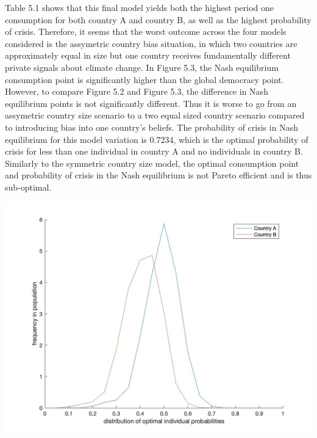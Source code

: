 \documentclass[11pt,preprint, authoryear]{elsarticle}
\let\origfigure\figure
\let\endorigfigure\endfigure
\renewenvironment{figure}[1][2] {
    \expandafter\origfigure\expandafter[H]
} {
    \endorigfigure
}
\numberwithin{equation}{section}
\numberwithin{figure}{section}
\numberwithin{table}{section}
\begin{document}
Table 5.1 shows that this final model yields both the highest period one
consumption for both country A and country B, as well as the highest
probability of crisis. Therefore, it seems that the worst outcome across
the four models considered is the assymetric country bias situation, in
which two countries are approximately equal in size but one country
receives fundamentally different private signals about climate change.
In Figure 5.3, the Nash equilibrium consumption point is significantly
higher than the global democracy point. However, to compare Figure 5.2
and Figure 5.3, the difference in Nash equilibrium points is not
significantly different. Thus it is worse to go from an assymetric
country size scenario to a two equal sized country scenario compared to
introducing bias into one country's beliefs. The probability of crisis
in Nash equilibrium for this model variation is 0.7234, which is the
optimal probability of crisis for less than one individual in country A
and no individuals in country B. Similarly to the symmetric country size
model, the optimal consumption point and probability of crisis in the
Nash equilibrium is not Pareto efficient and is thus sub-optimal.

\begin{figure}[H]

{\centering \includegraphics[width=0.8\linewidth]{images/Fig4_0.5Size0.9Bias} 

}

\caption{Assymetric country bias model: Kernel density function of the distribution of the optimal probabilty of crisis and frequency thereof across individuals in country A and country B}\label{fig:unnamed-chunk-7}
\end{figure}
\end{document}
